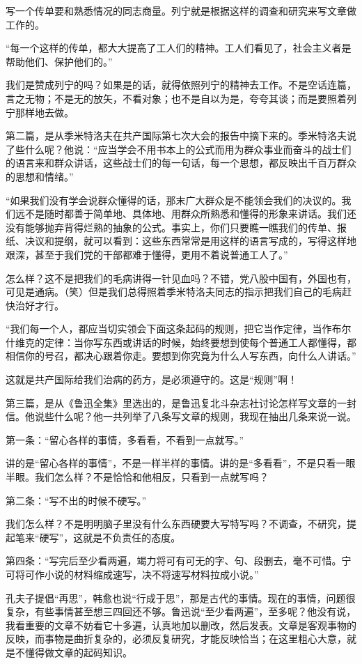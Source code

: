 写一个传单要和熟悉情况的同志商量。列宁就是根据这样的调查和研究来写文章做工作的。

“每一个这样的传单，都大大提高了工人们的精神。工人们看见了，社会主义者是帮助他们、保护他们的。”

我们是赞成列宁的吗？如果是的话，就得依照列宁的精神去工作。不是空话连篇，言之无物；不是无的放矢，不看对象；也不是自以为是，夸夸其谈；而是要照着列宁那样地去做。

第二篇，是从季米特洛夫在共产国际第七次大会的报告中摘下来的。季米特洛夫说了些什么呢？他说：“应当学会不用书本上的公式而用为群众事业而奋斗的战士们的语言来和群众讲话，这些战士们的每一句话，每一个思想，都反映出千百万群众的思想和情绪。”

“如果我们没有学会说群众懂得的话，那末广大群众是不能领会我们的决议的。我们远不是随时都善于简单地、具体地、用群众所熟悉和懂得的形象来讲话。我们还没有能够抛弃背得烂熟的抽象的公式。事实上，你们只要瞧一瞧我们的传单、报纸、决议和提纲，就可以看到：这些东西常常是用这样的语言写成的，写得这样地艰深，甚至于我们党的干部都难于懂得，更用不着说普通工人了。”

怎么样？这不是把我们的毛病讲得一针见血吗？不错，党八股中国有，外国也有，可见是通病。（笑）但是我们总得照着季米特洛夫同志的指示把我们自己的毛病赶快治好才行。

“我们每一个人，都应当切实领会下面这条起码的规则，把它当作定律，当作布尔什维克的定律：当你写东西或讲话的时候，始终要想到使每个普通工人都懂得，都相信你的号召，都决心跟着你走。要想到你究竟为什么人写东西，向什么人讲话。”

这就是共产国际给我们治病的药方，是必须遵守的。这是“规则”啊！

第三篇，是从《鲁迅全集》里选出的，是鲁迅复北斗杂志社讨论怎样写文章的一封信。他说些什么呢？他一共列举了八条写文章的规则，我现在抽出几条来说一说。

第一条：“留心各样的事情，多看看，不看到一点就写。”

讲的是“留心各样的事情”，不是一样半样的事情。讲的是“多看看”，不是只看一眼半眼。我们怎么样？不是恰恰和他相反，只看到一点就写吗？

第二条：“写不出的时候不硬写。”

我们怎么样？不是明明脑子里没有什么东西硬要大写特写吗？不调查，不研究，提起笔来“硬写”，这就是不负责任的态度。

第四条：“写完后至少看两遍，竭力将可有可无的字、句、段删去，毫不可惜。宁可将可作小说的材料缩成速写，决不将速写材料拉成小说。”

孔夫子提倡“再思”，韩愈也说“行成于思”，那是古代的事情。现在的事情，问题很复杂，有些事情甚至想三四回还不够。鲁迅说“至少看两遍”，至多呢？他没有说，我看重要的文章不妨看它十多遍，认真地加以删改，然后发表。文章是客观事物的反映，而事物是曲折复杂的，必须反复研究，才能反映恰当；在这里粗心大意，就是不懂得做文章的起码知识。

